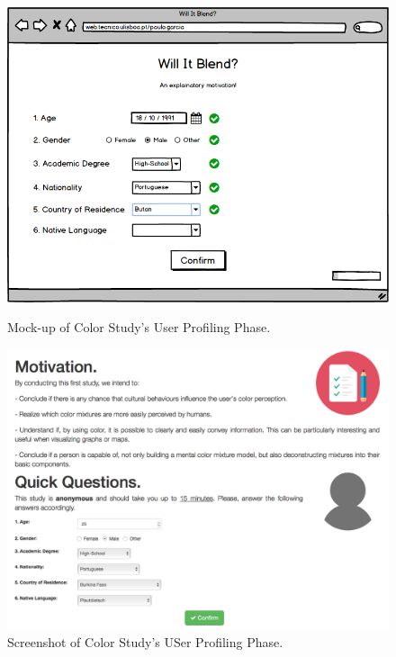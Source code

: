 \begin{figure}[htbp]
  \centering
  \begin{minipage}{0.48\textwidth}
		\centering
	  \includegraphics[width=\textwidth]{images/implementation/mockup_profiling.png}
	  \caption[Mock-up of Color Study's User Profiling Phase.]{Mock-up of Color Study's User Profiling Phase.}
	  \label{fig:mockup_profiling}
  \end{minipage}\hfill
  \begin{minipage}{0.48\textwidth}
		\centering
	  \includegraphics[width=\textwidth]{images/implementation/screen_profiling.png}
	  \caption[Screenshot of Color Study's User Profiling Phase.]{Screenshot of Color Study's USer Profiling Phase.}
	  \label{fig:screen_profiling}
  \end{minipage}
\end{figure}
